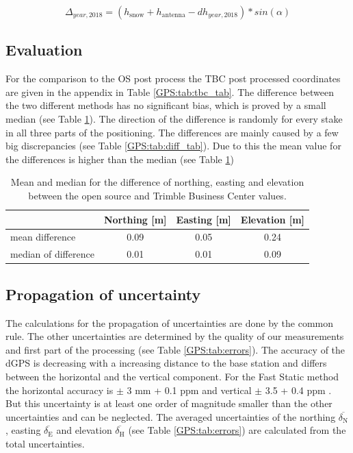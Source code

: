 \begin{equation}
	\Delta_{year,2018} = (h_{\text{snow}} + h_{\text{antenna}} - dh_{year,2018}) * sin(\alpha)
\end{equation}

\subsection{Evaluation}
For the comparison to the OS post process the TBC post processed coordinates are given in the appendix in Table \ref{GPS:tab:tbc_tab}.
The difference between the two different methods has no significant bias, which is proved by a small median (see Table \ref{GPS:tab:diff}).
The direction of the difference is randomly for every stake in all three parts of the positioning.
The differences are mainly caused by a few big discrepancies (see Table \ref{GPS:tab:diff_tab}).
Due to this the mean value for the differences is higher than the median (see Table \ref{GPS:tab:diff}) 

\begin{table}[h]
	\caption{Mean and median for the difference of northing, easting and elevation between the open source and Trimble Business Center values.}
	\centering
	\begin{tabular}{lccc}
	\toprule         
      &  Northing [m] & Easting [m] & Elevation [m] \\
	\midrule
    mean difference &  0.09 & 0.05 & 0.24 \\
    median of difference & 0.01 & 0.01 & 0.09 \\
    \bottomrule
	\end{tabular}
	\label{GPS:tab:diff}
\end{table}

\subsection{Propagation of uncertainty}

The calculations for the propagation of uncertainties are done by the common rule.
The other uncertainties are determined by the quality of our measurements and first part of the processing (see Table \ref{GPS:tab:errors}).
The accuracy of the dGPS is decreasing with a increasing distance to the base station and differs between the horizontal and the vertical component.
For the Fast Static method the horizontal accuracy is $ \pm $ 3 mm + 0.1 ppm and vertical $ \pm $ 3.5 + 0.4 ppm  \citep{Trquickstart}.
But this uncertainty is at least one order of magnitude smaller than the other uncertainties and can be neglected. 
The averaged uncertainties of the northing $ \overline{\delta_{\text{N}}} $, easting $ \overline{\delta_{\text{E}}} $ and elevation $ \overline{\delta_{\text{H}}} $ (see Table \ref{GPS:tab:errors}) are calculated from the total uncertainties.

